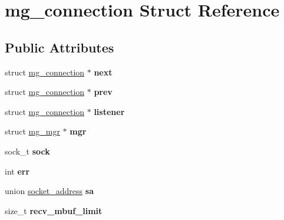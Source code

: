 \hypertarget{structmg__connection}{}\section{mg\+\_\+connection Struct Reference}
\label{structmg__connection}
\subsection*{Public Attributes}
\begin{DoxyCompactItemize}
\item 
\mbox{\label{structmg__connection_afcfd89f119a87cba6f6dfec2d2eda5d9}} 
struct \hyperlink{structmg__connection}{mg\+\_\+connection} $\ast$ {\bfseries next}
\item 
\mbox{\label{structmg__connection_aa93fd5ca83f11230bc971a68a7fa8d5e}} 
struct \hyperlink{structmg__connection}{mg\+\_\+connection} $\ast$ {\bfseries prev}
\item 
\mbox{\label{structmg__connection_a9392bec67d0dc8df58e6c171214ddf8d}} 
struct \hyperlink{structmg__connection}{mg\+\_\+connection} $\ast$ {\bfseries listener}
\item 
\mbox{\label{structmg__connection_ac341f1f2bd18e030fe90a914e4517506}} 
struct \hyperlink{structmg__mgr}{mg\+\_\+mgr} $\ast$ {\bfseries mgr}
\item 
\mbox{\label{structmg__connection_a608f2461b3dd53e503d6ed3c84ec55b0}} 
sock\+\_\+t {\bfseries sock}
\item 
\mbox{\label{structmg__connection_aa13a0bd4a2ce3d6384866acb7e00344a}} 
int {\bfseries err}
\item 
\mbox{\label{structmg__connection_a3dfa1816f5a4b0725d9d04be75bbb3f8}} 
union \hyperlink{unionsocket__address}{socket\+\_\+address} {\bfseries sa}
\item 
\mbox{\label{structmg__connection_ab15e90e7fb7b8719cc7dcc67f45856e1}} 
size\+\_\+t {\bfseries recv\+\_\+mbuf\+\_\+limit}
\item 

\end{DoxyCompactItemize}
